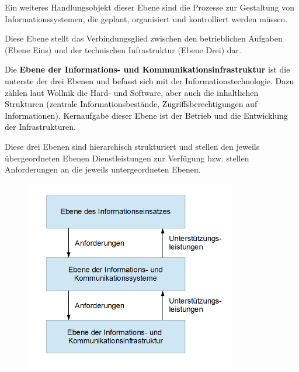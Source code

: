 \documentclass[a4paper]{article}
\begin{document}
{\sffamily\color{black}
Ein weiteres Handlungsobjekt dieser Ebene sind die Prozesse zur Gestaltung von Informationssystemen, die geplant,
organisiert und kontrolliert werden müssen.}

{\sffamily\color{black}
Diese Ebene stellt das Verbindungsglied zwischen den betrieblichen Aufgaben (Ebene Eins) und der technischen
Infrastruktur (Ebene Drei) dar.}


\bigskip

{\sffamily
\textcolor{black}{Die }\textbf{\textcolor{black}{Ebene der Informations- und
Kommunikationsinfrastruktur}}\textcolor{black}{ ist die unterste der drei Ebenen und befasst sich mit der
Informationstechnologie. Dazu zählen laut Wollnik die Hard- und Software, aber auch die inhaltlichen Strukturen
(zentrale Informationsbestände, Zugriffsberechtigungen auf Informationen). Kernaufgabe dieser Ebene ist der Betrieb und
die Entwicklung der Infrastrukturen.}}


\bigskip

{\sffamily\color{black}
Diese drei Ebenen sind hierarchisch strukturiert und stellen den jeweils übergeordneten Ebenen Dienstleistungen zur
Verfügung bzw. stellen Anforderungen an die jeweils untergeordneten Ebenen.\newline
}



\begin{figure}
\centering
\includegraphics[width=9.301cm,height=8.303cm]{ErsteVersionderHausarbeit11Boris-img/ErsteVersionderHausarbeit11Boris-img002.png}
\end{figure}

\bigskip


\bigskip


\bigskip
\end{document}
